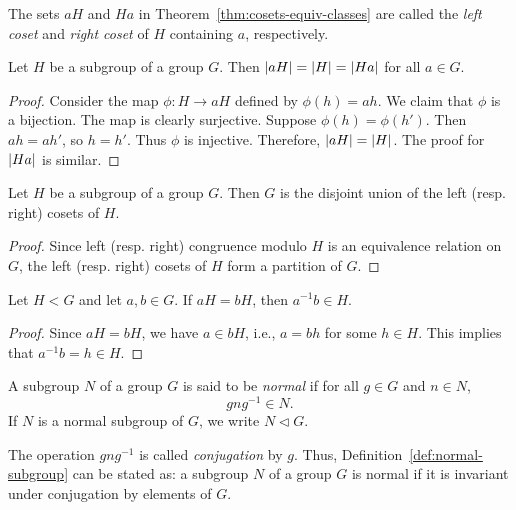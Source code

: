 \begin{definition}
    The sets \(aH\) and \(Ha\) in Theorem~\ref{thm:cosets-equiv-classes} are
    called the \emph{left coset} and \emph{right coset} of \(H\) containing
    \(a\), respectively.
\end{definition}

\begin{theorem}
    Let \(H\) be a subgroup of a group \(G\). Then \(\lvert aH \rvert = \lvert H \rvert =
    \lvert Ha \rvert\) for all \(a \in G\).
\end{theorem}

\begin{proof}
    Consider the map \(\phi: H \to aH\) defined by \(\phi(h) = ah\). We claim
    that \(\phi\) is a bijection. The map is clearly surjective. Suppose
    \(\phi(h) = \phi(h')\). Then \(ah = ah'\), so \(h = h'\). Thus \(\phi\) is
    injective. Therefore, \(\lvert aH \rvert = \lvert H \rvert\). The proof for
    \(\lvert Ha \rvert\) is similar.
\end{proof}

\begin{theorem}
    Let \(H\) be a subgroup of a group \(G\). Then \(G\) is the disjoint union
    of the left (resp. right) cosets of \(H\).
\end{theorem}

\begin{proof}
    Since left (resp. right) congruence modulo \(H\) is an equivalence relation
    on \(G\), the left (resp. right) cosets of \(H\) form a partition of \(G\).
\end{proof}


\begin{theorem}
    Let \(H < G\) and let \(a, b \in G\). If \(aH = bH\), then \(a^{-1}b \in
    H\).
\end{theorem}

\begin{proof}
    Since \(aH = bH\), we have \(a \in bH\), i.e., \(a = bh\) for some \(h \in
    H\). This implies that \(a^{-1}b = h \in H\).
\end{proof}

\begin{definition}
    \label{def:normal-subgroup}
    A subgroup \(N\) of a group \(G\) is said to be \emph{normal} if for all \(g
    \in G\) and \(n \in N\),
    \[
        gng^{-1} \in N.
    \]
    If \(N\) is a normal subgroup of \(G\), we write \(N \triangleleft G\).
\end{definition}

\begin{remark}
    The operation \(gng^{-1}\) is called \emph{conjugation} by \(g\). Thus,
    Definition~\ref{def:normal-subgroup} can be stated as: a subgroup \(N\) of a
    group \(G\) is normal if it is invariant under conjugation by elements of
    \(G\).
\end{remark}

